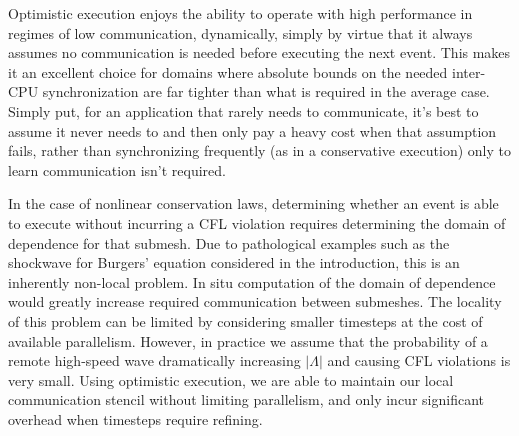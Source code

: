 Optimistic execution enjoys the ability to operate with high performance in regimes of low communication, dynamically, simply by virtue that it always assumes no communication is needed before executing the next event. This makes it an excellent choice for domains where absolute bounds on the needed inter-CPU synchronization are far tighter than what is required in the average case. Simply put, for an application that rarely needs to communicate, it's best to assume it never needs to and then only pay a heavy cost when that assumption fails, rather than synchronizing frequently (as in a conservative execution) only to learn communication isn't required.

 In the case of nonlinear conservation laws, determining whether an event is able to execute without incurring a CFL violation requires determining the domain of dependence for that submesh. Due to pathological examples such as the shockwave for Burgers' equation considered in the introduction, this is an inherently non-local problem. In situ computation of the domain of dependence would greatly increase required communication between submeshes. The locality of this problem can be limited by considering smaller timesteps at the cost of available parallelism. However, in practice we assume that the probability of a remote high-speed wave dramatically increasing $|\Lambda|$ and causing CFL violations is very small. Using optimistic execution, we are able to maintain our local communication stencil without limiting parallelism, and only incur significant overhead when timesteps require refining.


